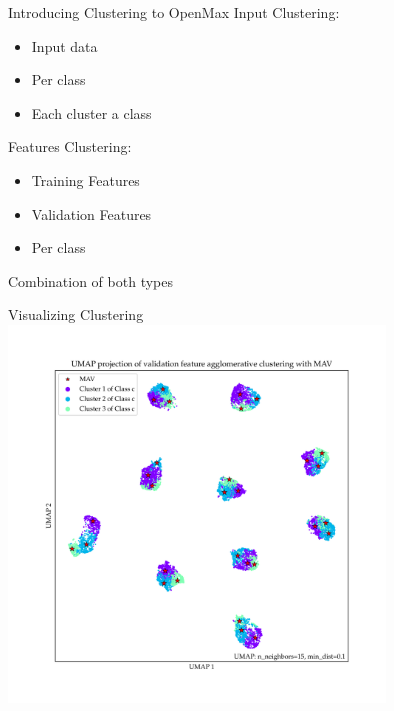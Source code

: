 \begin{frame}{Introducing Clustering to OpenMax}
	Input Clustering:
	\begin{itemize}
		\item Input data
		\item Per class
		\item Each cluster a class
	\end{itemize}
	Features Clustering:
	\begin{itemize}
		\item Training Features
		\item Validation Features
		\item Per class
	\end{itemize}
	Combination of both types
\end{frame}

\begin{frame}{Visualizing Clustering}
	\centering
	\includegraphics[width=0.75\textwidth]{figures/umap_projection_emnist_cluster.png}
\end{frame}
